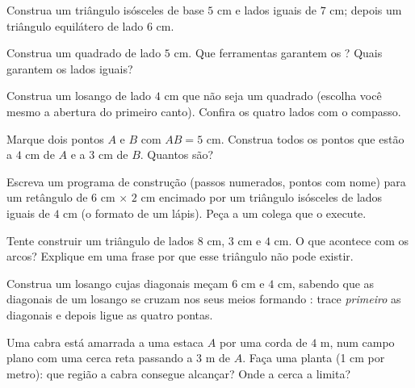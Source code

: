 \begin{exercise}[$\star$]\label{exo:g5:geometry:4}
Construa um triângulo isósceles de base $5$ cm e lados iguais de
$7$ cm; depois um triângulo equilátero de lado $6$ cm.
\end{exercise}

\begin{exercise}[$\star$]\label{exo:g5:geometry:5}
Construa um quadrado de lado $5$ cm. Que ferramentas garantem os
? Quais garantem os lados iguais?
\end{exercise}

\begin{exercise}[$\star$]\label{exo:g5:geometry:6}
Construa um losango de lado $4$ cm que não seja um quadrado (escolha
você mesmo a abertura do primeiro canto). Confira os quatro lados com
o compasso.
\end{exercise}

\begin{exercise}[$\star$]\label{exo:g5:geometry:7}
Marque dois pontos $A$ e $B$ com $AB = 5$ cm. Construa todos os
pontos que estão a $4$ cm de $A$ e a $3$ cm de $B$. Quantos são?
\end{exercise}

\begin{exercise}[$\star$]\label{exo:g5:geometry:8}
Escreva um programa de construção (passos numerados, pontos com nome)
para um retângulo de $6$ cm $\times$ $2$ cm encimado por um triângulo
isósceles de lados iguais de $4$ cm (o formato de um lápis). Peça a
um colega que o execute.
\end{exercise}

\begin{exercise}[$\star\star$]\label{exo:g5:geometry:9}
Tente construir um triângulo de lados $8$ cm, $3$ cm e $4$ cm. O que
acontece com os arcos? Explique em uma frase por que esse triângulo
não pode existir.
\end{exercise}

\begin{exercise}[$\star\star$]\label{exo:g5:geometry:10}
Construa um losango cujas diagonais meçam $6$ cm e $4$ cm, sabendo
que as diagonais de um losango se cruzam nos seus meios formando
: trace \emph{primeiro} as diagonais e depois ligue as
quatro pontas.
\end{exercise}

\begin{exercise}[$\star\star$]\label{exo:g5:geometry:11}
Uma cabra está amarrada a uma estaca $A$ por uma corda de $4$ m, num
campo plano com uma cerca reta passando a $3$ m de $A$. Faça uma
planta (1 cm por metro): que região a cabra consegue alcançar? Onde a
cerca a limita?
\end{exercise}
